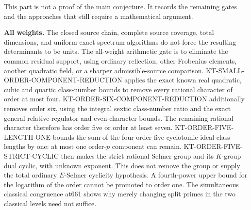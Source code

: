 \documentclass[11pt,a4paper]{article}
\theoremstyle{definition}
\renewcommand{\paragraph}[1]{\par\smallskip\noindent\textbf{#1}\quad\ignorespaces}
\begin{document}
This part is not a proof of the main conjecture. It records the
remaining gates and the approaches that still require a
mathematical argument.

\paragraph{All weights.}
The closed source chain, complete source coverage, total
dimensions, and uniform exact spectrum algorithms do not
force the resulting determinants to be units. The all-weight
arithmetic gate is to eliminate the common residual support,
using ordinary reflection, other Frobenius elements, another
quadratic field, or a sharper admissible-source comparison.
KT-SMALL-ORDER-COMPONENT-REDUCTION applies the exact known
real quadratic, cubic and quartic class-number bounds to
remove every rational character of order at most four.
KT-ORDER-SIX-COMPONENT-REDUCTION additionally removes order six,
using the integral sextic class-number ratio and the exact general
relative-regulator and even-character bounds.
The remaining rational character therefore has order five or
order at least seven. KT-ORDER-FIVE-LENGTH-ONE bounds the sum
of the four order-five cyclotomic ideal-class lengths by one:
at most one order-$p$ component can remain.
KT-ORDER-FIVE-STRICT-CYCLIC then makes the strict rational
Selmer group and its $K$-group dual cyclic, with unknown exponent.
This does not remove the group or supply the total ordinary
$E$-Selmer cyclicity hypothesis.
A fourth-power upper bound for the logarithm of the order
cannot be promoted to order one. The simultaneous classical
congruence at661 shows why merely changing split primes in
the two classical levels need not suffice.
\end{document}
